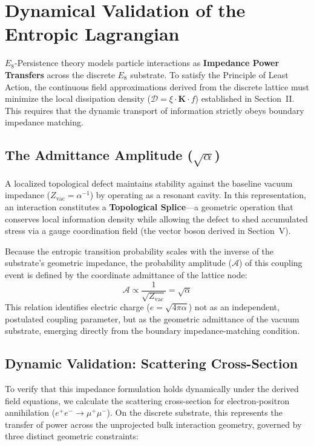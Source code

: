 \section{Dynamical Validation of the Entropic Lagrangian}
\label{app:impedance_power_transfer}

$E_8$-Persistence theory models particle interactions as \textbf{Impedance Power Transfers} across the discrete $E_8$ substrate. To satisfy the Principle of Least Action, the continuous field approximations derived from the discrete lattice must minimize the local dissipation density ($\mathcal{D} = \xi \cdot \mathbf{K} \cdot f$) established in Section~II. This requires that the dynamic transport of information strictly obeys boundary impedance matching.

\subsection{The Admittance Amplitude (\texorpdfstring{$\sqrt{\alpha}$}{sqrt alpha})}

A localized topological defect maintains stability against the baseline vacuum impedance ($Z_{\text{vac}} = \alpha^{-1}$) by operating as a resonant cavity. In this representation, an interaction constitutes a \textbf{Topological Splice}—a geometric operation that conserves local information density while allowing the defect to shed accumulated stress via a gauge coordination field (the vector boson derived in Section~V).

Because the entropic transition probability scales with the inverse of the substrate's geometric impedance, the probability amplitude ($\mathcal{A}$) of this coupling event is defined by the coordinate admittance of the lattice node:
\begin{equation}
\mathcal{A} \propto \frac{1}{\sqrt{Z_{\text{vac}}}} = \sqrt{\alpha}
\end{equation}
This relation identifies electric charge ($e = \sqrt{4\pi\alpha}$) not as an independent, postulated coupling parameter, but as the geometric admittance of the vacuum substrate, emerging directly from the boundary impedance-matching condition.

\subsection{Dynamic Validation: Scattering Cross-Section}

To verify that this impedance formulation holds dynamically under the derived field equations, we calculate the scattering cross-section for electron-positron annihilation ($e^+e^- \to \mu^+\mu^-$). On the discrete substrate, this represents the transfer of power across the unprojected bulk interaction geometry, governed by three distinct geometric constraints:

